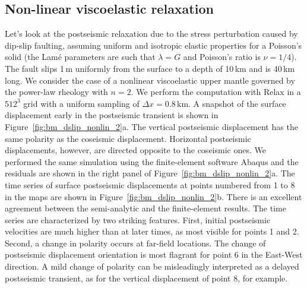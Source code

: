 \documentclass[10pt]{article}
\begin{document}
\subsection{Non-linear viscoelastic relaxation}
Let's look at the postseismic relaxation due to the stress perturbation caused by dip-slip faulting, assuming uniform and isotropic elastic properties for a Poisson's solid (the Lam{\'e} parameters are such that $\lambda=G$ and Poisson's ratio is $\nu=1/4$). The fault slips 1\,m uniformly from the surface to a depth of 10\,km and is 40\,km long. We consider the case of a nonlinear viscoelastic upper mantle governed by the power-law rheology with $n=2$. We perform the computation with Relax in a $512^3$ grid with a uniform sampling of $\Delta x=0.8\,$km. A snapshot of the surface displacement early in the postseismic transient is shown in Figure~\ref{fig:bm_dslip_nonlin_2}a. The vertical postseismic displacement has the same polarity as the coseismic displacement. Horizontal postseismic displacements, however, are directed opposite to the coseismic ones. We performed the same simulation using the finite-element software Abaqus and the residuals are shown in the right panel of Figure~\ref{fig:bm_dslip_nonlin_2}a. The time series of surface postseismic displacements at points numbered from 1 to 8 in the maps are shown in Figure~\ref{fig:bm_dslip_nonlin_2}b. There is an excellent agreement between the semi-analytic and the finite-element results. The time series are characterized by two striking features. First, initial postseismic velocities are much higher than at later times, as most visible for points 1 and 2. Second, a change in polarity occurs at far-field locations. The change of postseismic displacement orientation is most flagrant for point 6 in the East-West direction. A mild change of polarity can be misleadingly interpreted as a delayed postseismic transient, as for the vertical displacement of point 8, for example.
%
\end{document}
